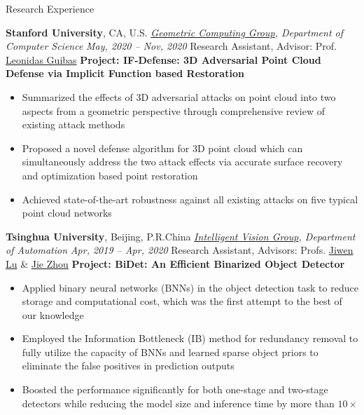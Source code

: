\documentclass{resume} %
\begin{document}
\vspace{-0.2cm}

\begin{rSection}{Research Experience}

{\textbf{Stanford University}}, {CA, U.S.}\newline
\emph{\href{https://geometry.stanford.edu/}{Geometric Computing Group}, Department of Computer Science} \hfill {\em May, 2020 -- Nov, 2020}\newline
Research Assistant, Advisor: Prof. \href{https://geometry.stanford.edu/member/guibas/index.html}{Leonidas Guibas}\newline
\textbf{Project: IF-Defense: 3D Adversarial Point Cloud Defense via Implicit Function based Restoration}
\begin{itemize}
    \item Summarized the effects of 3D adversarial attacks on point cloud into two aspects from a geometric perspective through comprehensive review of existing attack methods
    \item Proposed a novel defense algorithm for 3D point cloud which can simultaneously address the two attack effects via accurate surface recovery and optimization based point restoration
    \item Achieved state-of-the-art robustness against all existing attacks on five typical point cloud networks\newline
\end{itemize}

\vspace{-0.15cm}

{\textbf{Tsinghua University}}, {Beijing, P.R.China}\newline
\emph{\href{http://ivg.au.tsinghua.edu.cn/index.php}{Intelligent Vision Group}, Department of Automation} \hfill {\em Apr, 2019 -- Apr, 2020}\newline
Research Assistant, Advisors: Profs. \href{http://ivg.au.tsinghua.edu.cn/Jiwen_Lu/}{Jiwen Lu} \& \href{https://www.tsinghua.edu.cn/publish/auen/1713/2011/20110506105532098625469/20110506105532098625469_.html}{Jie Zhou}\newline
\textbf{Project: BiDet: An Efficient Binarized Object Detector}
\begin{itemize}
    \item Applied binary neural networks (BNNs) in the object detection task to reduce storage and computational cost, which was the first attempt to the best of our knowledge
    \item Employed the Information Bottleneck (IB) method for redundancy removal to fully utilize the capacity of BNNs and learned sparse object priors to eliminate the false positives in prediction outputs
    \item Boosted the performance significantly for both one-stage and two-stage detectors while reducing the model size and inference time by more than $10\times$\newline
\end{itemize}


\end{rSection}
\end{document}
